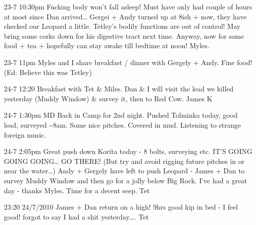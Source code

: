 23-7 10:30pm Fucking body won't fall asleep! Must have only had couple
of hours at most since Dan arrived\ldots{} Gergei + Andy turned up at
8ish + now, they have checked our Leopard a little. Tetley's bodily
functions are out of control! May bring some corks down for his
digestive tract next time. Anyway, now for some food + tea + hopefully
can stay awake till bedtime at noon! Myles.

23-7 11pm Myles and I share breakfast / dinner with Gergely + Andy. Fine
food! (Ed: Believe this was Tetley)

24-7 12:20 Breakfast with Tet \& Miles. Dan \& I will visit the lead we
killed yesterday (Muddy Window) \& survey it, then to Red Cow. James K

24-7 1:30pm MD Back in Camp for 2nd night. Pushed Tolminka today, good
lead, surveyed \textasciitilde{}8am. Some nice pitches. Covered in mud.
Listening to strange foreign music.

24-7 2:05pm Great push down Korita today - 8 bolts, surveying etc. IT'S
GOING GOING GOING\ldots{} GO THERE! (But try and avoid rigging future
pitches in or near the water\ldots{}) Andy + Gergely have left to push
Leopard - James + Dan to survey Muddy Window and then go for a jolly
below Big Rock. I've had a great day - thanks Myles. Time for a decent
seep. Tet

23:20 24/7/2010 James + Dan return on a high! 9hrs good kip in bed - I
feel good! forgot to say I had a shit yesterday\ldots{}. Tet
